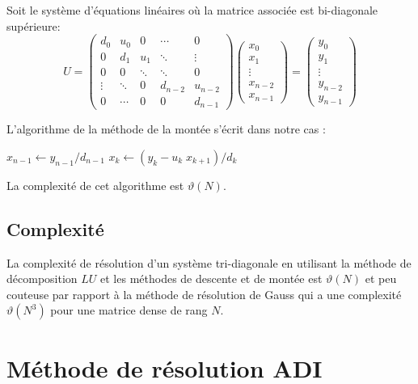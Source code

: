 \documentclass{article}
\begin{document}
Soit le système d'équations linéaires où la matrice associée est bi-diagonale supérieure:
\begin{equation}
U = \begin{pmatrix}
    d_0 & u_0 & 0 & \cdots & 0 \\
    0  & d_1 & u_1 & \ddots & \vdots \\
    0 & 0 &  \ddots & \ddots & 0 \\
    \vdots & \ddots & 0  &d_{n-2} & u_{n-2} \\
    0 & \cdots & 0 & 0 & d_{n-1}
\end{pmatrix}
\begin{pmatrix}
   x_0 \\
   x_1 \\
    \vdots\\
    x_{n-2} \\
    x_{n-1}
\end{pmatrix}
=
\begin{pmatrix}
   y_0 \\
   y_1 \\
    \vdots\\
    y_{n-2} \\
    y_{n-1}
\end{pmatrix}
\end{equation}

L'algorithme de la méthode de la montée s'écrit dans notre cas :
\begin{algorithmic}[1]
\State $x_{n-1} \gets y_{n-1}/d_{n-1}$
 \State $x_k \gets (y_k-u_k \; x_{k+1}) / d_k$
\EndFor                 
\EndFunction
\end{algorithmic}

La complexité de cet algorithme est $\vartheta(N)$.

\subsection{Complexité}

La complexité de résolution d'un système tri-diagonale en utilisant la méthode de décomposition $LU$ et les
méthodes de descente et de montée est $\vartheta(N)$ et peu couteuse par rapport à la méthode
de résolution de Gauss qui a une complexité $\vartheta(N^3)$  pour une matrice dense de rang $N$.
   
\section {Méthode de résolution ADI}
\end{document}
